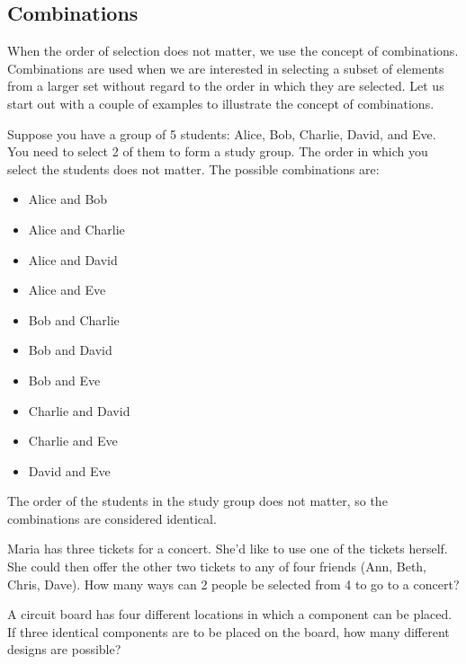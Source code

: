 \subsection*{Combinations}

When the order of selection does not matter, we use the concept of combinations. Combinations are used when we are interested in selecting a subset of elements from a larger set without regard to the order in which they are selected. Let us start out with a couple of examples to illustrate the concept of combinations.

\begin{example}
    Suppose you have a group of 5 students: Alice, Bob, Charlie, David, and Eve. You need to select 2 of them to form a study group. The order in which you select the students does not matter. The possible combinations are:
    \begin{itemize}
        \item Alice and Bob
        \item Alice and Charlie
        \item Alice and David
        \item Alice and Eve
        \item Bob and Charlie
        \item Bob and David
        \item Bob and Eve
        \item Charlie and David
        \item Charlie and Eve
        \item David and Eve
    \end{itemize}
    The order of the students in the study group does not matter, so the combinations are considered identical.
\end{example}

\begin{example}
    Maria has three tickets for a concert. She'd like to use one of the tickets herself. She could then offer the other two tickets to any of four friends (Ann, Beth, Chris, Dave). How many ways can 2 people be selected from 4 to go to a concert?
\end{example}

\begin{example}
A circuit board has four different locations in which a component can be placed. If three identical components are to be placed on the board, how many different designs are possible?
\end{example}

